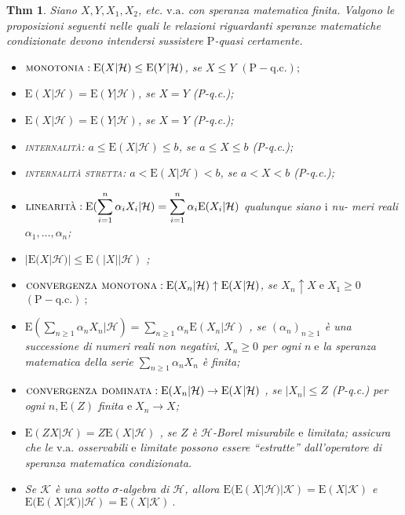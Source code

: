 \documentclass[a4paper,11pt]{article}
\theoremstyle{plain}
\newtheorem{thm}{Thm}[section]
\theoremstyle{definition}
\theoremstyle{remark}
\begin{document}
\begin{thm} Siano $X, Y, X_{1}, X_{2}$, etc. $\mathrm{v}.\mathrm{a}$. con speranza matematica finita. Valgono le proposizioni seguenti nelle quali le relazioni riguardanti speranze matematiche condizionate devono intendersi sussistere $\mathrm{P}$-quasi certamente.
\begin{itemize}
    \item $\textsc{monotonia}: \mathrm{E}(X|\mathcal{H})\leq \mathrm{E}(Y|\mathcal{H})$, se $X\leq Y$ $(\mathrm{P}-\mathrm{q}.\mathrm{c}.);$
    
    \item $\mathrm{E}(X|\mathcal{H})=\mathrm{E}(Y|\mathcal{H})$, se $X=Y$ (P-q.c.);
    
    \item $\mathrm{E}(X|\mathcal{H})=\mathrm{E}(Y|\mathcal{H})$, se $X=Y$ (P-q.c.);
    
    \item \textsc{internalità}: $a\leq \mathrm{E}(X|\mathcal{H})\leq b$, se $a\leq X\leq b$ (P-q.c.);
    
    \item  \textsc{internalità stretta}: $a<\mathrm{E}(X|\mathcal{H})<b$, se $a<X<b$ (P-q.c.);
    \item $\textsc{linearità}: \displaystyle \mathrm{E}(\sum_{i=1}^{n}\alpha_{i}X_{i}|\mathcal{H})=\sum_{i=1}^{n}\alpha_{i}\mathrm{E}(X_{i}|\mathcal{H})$ qualunque siano $\mathrm{i}$ nu- meri reali $\alpha_{1}, \ldots, \alpha_{n}$;
    
    \item  $|\mathrm{E}(X|\mathcal{H})|\leq \mathrm{E}(|X||\mathcal{H})$ ;
    \item $ \textsc{convergenza monotona}: \mathrm{E}(X_{n}|\mathcal{H})\uparrow \mathrm{E}(X|\mathcal{H})$, se $X_{n}\uparrow X\mathrm{\; e \;}X_{1}\geq 0$ $(\mathrm{P}- \mathrm{q}.\mathrm{c}.)\ ;$
    \item  $\displaystyle \mathrm{E}(\sum_{n\geq 1}\alpha_{n}X_{n}|\mathcal{H})=\sum_{n\geq 1}\alpha_{n}\mathrm{E}(X_{n}|\mathcal{H})$ , se $(\alpha_{n})_{n\geq 1}$ è una successione di numeri reali non negativi, $X_{n}\geq 0$ per ogni $n\mathrm{\; e}$ la speranza matematica della serie $\displaystyle \sum_{n\geq 1}\alpha_{n}X_{n}$ è finita;
    \item $ \textsc{convergenza dominata}: \mathrm{E}(X_{n}|\mathcal{H})\rightarrow \mathrm{E}(X|\mathcal{H})$ , se $|X_{n}|\leq Z$ (P-q.c.) per ogni $n, \mathrm{E}(Z)$ finita $\mathrm{e \;}X_{n}\rightarrow X$;
    
    \item $\mathrm{E}(ZX|\mathcal{H})=Z\mathrm{E}(X|\mathcal{H})$ , se $Z$ è $\mathcal{H}$-Borel misurabile $\mathrm{e}$ limitata; assicura che le $\mathrm{v}.\mathrm{a}.$ osservabili $\mathrm{e}$ limitate possono essere ``estratte'' dall'operatore di speranza matematica condizionata.
    
    \item Se $\mathcal{K}$ è una sotto $\sigma$-algebra di $\mathcal{H}$, allora $\mathrm{E}(\mathrm{E}(X|\mathcal{H})|\mathcal{K})=\mathrm{E}(X|\mathcal{K})$ e $\mathrm{E}(\mathrm{E}(X|\mathcal{K})|\mathcal{H})=\mathrm{E}(X|\mathcal{K})\ .$
    \end{itemize}
\end{thm}
\end{document}
